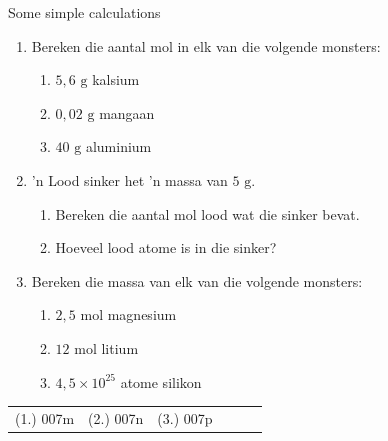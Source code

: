             \begin{exercises} {Some simple calculations}
            \nopagebreak \noindent \vspace{-2cm}
      \label{m38717*id278090}\begin{enumerate}[noitemsep, label=\textbf{\arabic*}. ] 
            \label{m38717*uid24}\item Bereken die aantal mol in elk van die volgende monsters:
\label{m38717*id278106}\begin{enumerate}[noitemsep, label=\textbf{\alph*}. ] 
            \label{m38717*uid25}\item $5,6 \text{ g}$ kalsium
\label{m38717*uid26}\item $0,02 \text{ g}$ mangaan
\label{m38717*uid27}\item $40\text{ g}$ aluminium
\end{enumerate}
               \label{m38717*uid28}\item  'n Lood sinker het 'n massa van $5 \text{ g}$.
\label{m38717*id278159}\begin{enumerate}[noitemsep, label=\textbf{\alph*}. ] 
            \label{m38717*uid29}\item Bereken die aantal mol lood wat die sinker bevat.
\label{m38717*uid30}\item Hoeveel lood atome is in die sinker?
\end{enumerate}
                \label{m38717*uid31}\item Bereken die massa van elk van die volgende monsters:
\label{m38717*id278201}\begin{enumerate}[noitemsep, label=\textbf{\alph*}. ] 
            \label{m38717*uid32}\item $2,5\text{ mol}$ magnesium
\label{m38717*uid33}\item $12 \text{ mol}$ litium
\label{m38717*uid34}\item $4,5 \times 10^{25}$ atome silikon
\end{enumerate}
                \end{enumerate}
\practiceinfo
\par 
 \par \begin{tabular}[h]{cccccc}
 (1.) 007m  &  (2.) 007n  &  (3.) 007p  & \end{tabular}
\end{exercises}
